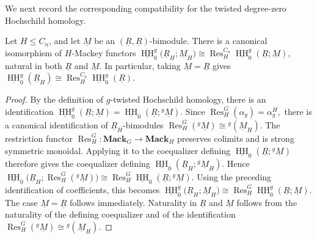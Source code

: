\documentclass[11pt,oneside]{amsart}
\DeclareMathOperator{\HH}{HH}
\numberwithin{equation}{section}
\numberwithin{figure}{section}
\theoremstyle{plain}
\theoremstyle{definition}
\theoremstyle{remark}
\begin{document}
 


 We next record the corresponding compatibility for the twisted
degree-zero Hochschild homology.



\begin{lemma}\label{lem:twisted-HH0-restriction}
Let \(H\leq C_n\), and let \(\underline M\) be an
\((\underline R,\underline R)\)-bimodule.  There is a canonical isomorphism
of \(H\)-Mackey functors
\(
\underline{\HH}_0^g
\bigl(\underline R_H;\underline M_H\bigr)
\cong
\operatorname{Res}^{C_n}_H
\underline{\HH}_0^g(\underline R;\underline M),
\)
natural in both \(\underline R\) and \(\underline M\).  In particular, taking
\(\underline M=\underline R\) gives
\(
\underline{\HH}_0^g(\underline R_H)
\cong
\operatorname{Res}^{C_n}_H\underline{\HH}_0^g(\underline R).
\)
\end{lemma}

\begin{proof}
By the definition of \(g\)-twisted Hochschild homology, there is an
identification
\(
\underline{\HH}_0^g(\underline R;\underline M)
=
\underline{\HH}_0(\underline R;{}^g\underline M).
\)
Since
\(
\operatorname{Res}_H^G(\alpha_g)=\alpha_g^H,
\)
there is a canonical identification of \(\underline R_H\)-bimodules
\(
\operatorname{Res}_H^G({}^g\underline M)
\cong
{}^g(\underline M_H).
\)
The restriction functor
\(\operatorname{Res}_H^G:\mathbf{Mack}_G\to\mathbf{Mack}_H\)
preserves colimits and is strong symmetric monoidal. Applying it to the
coequalizer defining
\(\underline{\HH}_0(\underline R;{}^g\underline M)\) therefore gives
the coequalizer defining
\(\underline{\HH}_0(\underline R_H;{}^g\underline M_H)\). Hence
\(
\underline{\HH}_0
\bigl(\underline R_H;
\operatorname{Res}_H^G({}^g\underline M)
\bigr)
\cong
\operatorname{Res}_H^G
\underline{\HH}_0(\underline R;{}^g\underline M).
\)
Using the preceding identification of coefficients, this becomes
\(
\underline{\HH}_0^g
\bigl(\underline R_H;\underline M_H\bigr)
\cong
\operatorname{Res}_H^G
\underline{\HH}_0^g(\underline R;\underline M).
\)
The case \(\underline M=\underline R\) follows immediately. Naturality
in \(\underline R\) and \(\underline M\) follows from the naturality of
the defining coequalizer and of the identification
\(\operatorname{Res}_H^G({}^g\underline M)\cong{}^g(\underline M_H)\).
\end{proof}
\end{document}

